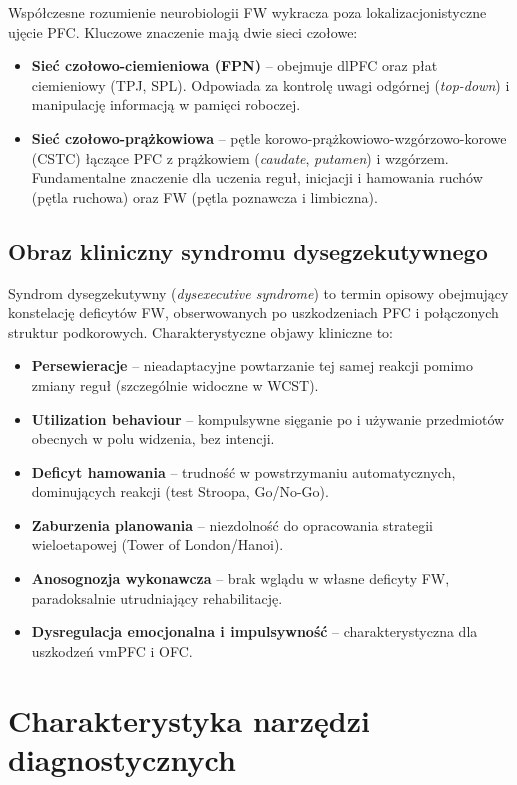 \documentclass[11pt,a4paper]{article}
\begin{document}
Współczesne rozumienie neurobiologii FW wykracza poza lokalizacjonistyczne ujęcie PFC. Kluczowe znaczenie mają dwie sieci czołowe:

\begin{itemize}
    \item \textbf{Sieć czołowo-ciemieniowa (FPN)} -- obejmuje dlPFC oraz płat ciemieniowy (TPJ, SPL). Odpowiada za kontrolę uwagi odgórnej (\textit{top-down}) i manipulację informacją w pamięci roboczej.
    \item \textbf{Sieć czołowo-prążkowiowa} -- pętle korowo-prążkowiowo-wzgórzowo-korowe (CSTC) łączące PFC z prążkowiem (\textit{caudate}, \textit{putamen}) i wzgórzem. Fundamentalne znaczenie dla uczenia reguł, inicjacji i hamowania ruchów (pętla ruchowa) oraz FW (pętla poznawcza i limbiczna).
\end{itemize}

\subsection{Obraz kliniczny syndromu dysegzekutywnego}

Syndrom dysegzekutywny (\textit{dysexecutive syndrome}) to termin opisowy obejmujący konstelację deficytów FW, obserwowanych po uszkodzeniach PFC i połączonych struktur podkorowych. Charakterystyczne objawy kliniczne to:

\begin{itemize}
    \item \textbf{Persewieracje} -- nieadaptacyjne powtarzanie tej samej reakcji pomimo zmiany reguł (szczególnie widoczne w WCST).
    \item \textbf{Utilization behaviour} -- kompulsywne sięganie po i używanie przedmiotów obecnych w polu widzenia, bez intencji.
    \item \textbf{Deficyt hamowania} -- trudność w powstrzymaniu automatycznych, dominujących reakcji (test Stroopa, Go/No-Go).
    \item \textbf{Zaburzenia planowania} -- niezdolność do opracowania strategii wieloetapowej (Tower of London/Hanoi).
    \item \textbf{Anosognozja wykonawcza} -- brak wglądu w własne deficyty FW, paradoksalnie utrudniający rehabilitację.
    \item \textbf{Dysregulacja emocjonalna i impulsywność} -- charakterystyczna dla uszkodzeń vmPFC i OFC.
\end{itemize}

\section{Charakterystyka narzędzi diagnostycznych}
\end{document}
